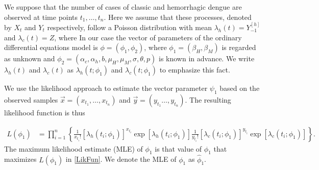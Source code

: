 We suppose that the number of cases of classic and hemorrhagic
dengue are observed at time points $t_{1}, \dots , t_{n}$.
Here we assume that these processes, denoted by $X_{t}$ and
$Y_{t}$ respectively, follow a Poisson distribution with mean
$\lambda_{h}\left(t\right)=Y_{-1}^{[h]}$ and
$\lambda_{c}\left(t\right)=Z$, where
In our case the vector of parameters of the ordinary differential
equations model is $\phi=\left(\phi_{1},\phi_{2}\right)$, where
$\phi_{1}=\left(\beta_{H},\beta_{M}\right)$ is regarded as unknown and
$\phi_{2}=\left(\alpha_{c},\alpha_{h},b,\mu_{H},\mu_{M},\sigma,\theta,p\right)$
is known in advance. We write $\lambda_{h}\left(t\right)$ and
$\lambda_{c}\left(t\right)$ as $\lambda_{h}\left(t;\phi_{1}\right)$
and $\lambda_{c}\left(t;\phi_{1}\right)$ to emphasize this fact.

We use the likelihood approach to estimate the vector
parameter  $\psi_{1}$ based on the observed samples
$\vec{x}=\left(x_{t_1}, \dots , x_{t_n} \right)$ and
$\vec{y}=\left(y_{t_1} \dots , y_{t_n} \right)$. The resulting
likelihood function is thus

\begin{equation}
    \begin{split}
        L \left( \phi_{1} \right)
         &= \prod_{i = 1} ^ {n} 
         \left \{ 
             \frac{1}{x_{t_i}!}
                 \left[\lambda_{h}
                     \left(t_{i};\phi_{1}\right)
                 \right] ^ {x_{t_i}} \exp
                 \left[
                     \lambda_{h} \left(t_{i}; \phi_{1} \right)
                 \right] 
         \right. 
        \left.
             \frac{1}{y_{t_i}!}
             \left[\lambda_{c}
                 \left(t_{i};\phi_{1}\right)
             \right] ^ {y_{t_i}}
             \exp
             \left[
                 \lambda_{c}
                 \left(t_{i};\phi_{1}\right)
             \right]
         \right\}.\label{LikFun}
    \end{split}
\end{equation}
The maximum likelihood estimate (MLE) of $\phi_{1}$ is that value 
of $\phi_{1}$ that maximizes $L\left(\phi_{1}\right)$ in 
\eqref{LikFun}. We denote the MLE of $\phi_{1}$ as $\hat{\phi}_{1}$.

